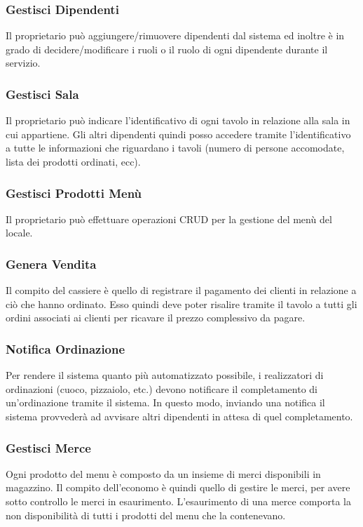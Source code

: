 \subsubsection{Gestisci Dipendenti}
Il proprietario può aggiungere/rimuovere dipendenti dal sistema ed inoltre è in grado di decidere/modificare i ruoli o il ruolo di ogni dipendente durante il servizio.

\subsubsection{Gestisci Sala}
Il proprietario può indicare l'identificativo di ogni tavolo in relazione alla sala in cui appartiene. Gli altri dipendenti quindi posso accedere tramite l'identificativo a tutte le informazioni che riguardano i tavoli (numero di persone accomodate, lista dei prodotti ordinati, ecc).

\subsubsection{Gestisci Prodotti Menù}
Il proprietario può effettuare operazioni CRUD per la gestione del menù del locale.

\subsubsection{Genera Vendita}
Il compito del cassiere è quello di registrare il pagamento dei clienti in relazione a ciò che hanno ordinato. Esso quindi deve poter risalire tramite il tavolo a tutti gli ordini associati ai clienti per ricavare il prezzo complessivo da pagare.

\subsubsection{Notifica Ordinazione}
Per rendere il sistema quanto più automatizzato possibile, i realizzatori di ordinazioni (cuoco, pizzaiolo, etc.) devono notificare il completamento di un'ordinazione tramite il sistema. In questo modo, inviando una notifica il sistema provvederà ad avvisare altri dipendenti in attesa di quel completamento.

\subsubsection{Gestisci Merce}
Ogni prodotto del menu è composto da un insieme di merci disponibili in magazzino. Il compito dell'economo è quindi quello di gestire le merci, per avere sotto controllo le merci in esaurimento. L'esaurimento di una merce comporta la non disponibilità di tutti i prodotti del menu che la contenevano.

